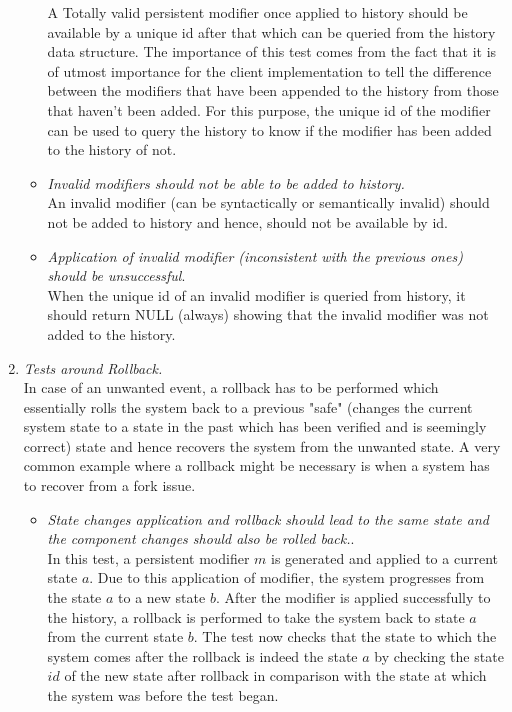 \begin{enumerate}[\IEEEsetlabelwidth{Z}]
\begin{itemize}[]
A Totally valid persistent modifier once applied to history should be available by a unique id after that which can be queried from the history data structure. The importance of this test comes from the fact that it is of utmost importance for the client implementation to tell the difference between the modifiers that have been appended to the history from those that haven't been added. For this purpose, the unique id of the modifier can be used to query the history to know if the modifier has been added to the history of not.
\item \textit{Invalid modifiers should not be able to be added to history.}\\
An invalid modifier (can be syntactically or semantically invalid) should not be added to history and hence, should not be available by id.
\item \textit{Application of invalid modifier (inconsistent with the previous ones) should be unsuccessful}.\\
When the unique id of an invalid modifier is queried from history, it should return NULL (always) showing that the invalid modifier was not added to the history.
\end{itemize}
\item \textit{Tests around Rollback.}\\
In case of an unwanted event, a rollback has to be performed which essentially rolls the system back to a previous "safe" (changes the current system state to a state in the past which has been verified and is seemingly correct) state and hence recovers the system from the unwanted state. A very common example where a rollback might be necessary is when a system has to recover from a fork issue.
\begin{itemize}[]
\item \textit{State changes application and rollback should lead to the same state and the component changes should also be rolled back.}.\\
In this test, a persistent modifier $m$ is generated and applied to a current state $a$. Due to this application of modifier, the system progresses from the state $a$ to a new state $b$. After the modifier is applied successfully to the history, a rollback is performed to take the system back to state $a$ from the current state $b$. The test now checks that the state to which the system comes after the rollback is indeed the state $a$ by checking the state $id$ of the new state after rollback in comparison with the state at which the system was before the test began.\\

\end{itemize}
\end{enumerate}
